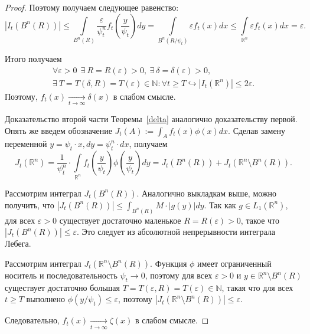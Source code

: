 \begin{proof}
        Поэтому получаем следующее равенство: 
        \begin{equation*}
            \left|I_t\left(B^n(R) \right)\right| \leq \int\limits_{B^n(R)} \frac{\varepsilon}{\psi_t^n} f_t\left(\frac{y}{\psi_t}\right) dy = 
            \int\limits_{B^n(R / \psi_t)} \varepsilon f_t\left(x\right) dx \leq \int\limits_{\mathbb{R}^n} \varepsilon f_t\left(x\right) dx = \varepsilon.
        \end{equation*}
        
        Итого получаем
        \begin{multline*}
            \forall \varepsilon > 0 ~~ \exists~ R = R(\varepsilon) >0, ~  \exists~ \delta = \delta(\varepsilon) > 0, ~ \\\exists~ T = T(\delta, R) = T(\varepsilon) \in \mathbb{N} : 
            \forall t \geq T \hookrightarrow \left|I_t\left( \mathbb{R}^n \right)\right| \leq 
             2 \varepsilon.
        \end{multline*}
        Поэтому, $f_t(x) \underset{t \to \infty}{\longrightarrow} \delta(x)$ в слабом смысле.

        Доказательство второй части Теоремы~\ref{delta} аналогично доказательству первой. Опять же введем обозначение $J_t(A) := \int_{A} f_t(x) \phi(x) dx$. Сделав замену переменной $y = \psi_t \cdot x, dy = \psi_t^n \cdot dx$, получаем
        \begin{equation*}
            J_t\left( \mathbb{R}^n\right) = \dfrac{1}{\psi_t^n} \cdot \int\limits_{\mathbb{R}^n} f_t\left(\frac{y}{\psi_t}\right) \phi\left(\frac{y}{\psi_t}\right) dy = J_t\left(B^n(R) \right) + J_t\left(\mathbb{R}^n \setminus B^n(R) \right).
        \end{equation*}

        Рассмотрим интеграл $J_t\left(B^n(R) \right)$. Аналогично выкладкам выше, можно получить, что
        $
            \left| J_t\left(B^n(R) \right) \right| \leq \int_{B^n(R)} M \cdot |g(y)| dy. 
        $
        Так как $g \in L_1\left( \mathbb{R}^n \right)$, для всех $\varepsilon > 0$ существует достаточно маленькое $R = R(\varepsilon) > 0$, такое что $\left|J_t\left(B^n(R) \right)\right| \leq \varepsilon$. Это следует из абсолютной непрерывности интеграла Лебега.
        
        Рассмотрим интеграл $J_t\left(\mathbb{R}^n \setminus B^n(R) \right)$. Функция $\phi$ имеет ограниченный носитель и последовательность $\psi_t \to 0$, поэтому для всех $\varepsilon > 0$ и $y \in \mathbb{R}^n \setminus B^n(R)$ существует достаточно большая $T = T(\varepsilon, R) = T(\varepsilon) \in \mathbb{N}$, такая что для всех
        $t \geq T$ выполнено $\phi\left(y / \psi_t\right) \leq \varepsilon$, поэтому $|J_t\left(\mathbb{R}^n \setminus B^n(R) \right)| \leq \varepsilon$.

        Следовательно, $f_t(x) \underset{t \to \infty}{\longrightarrow} \zeta(x)$ в слабом смысле.
        \end{proof}

